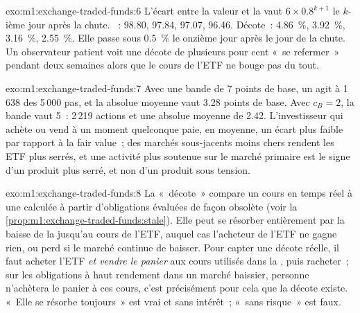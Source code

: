 \begin{solution}{exo:m1:exchange-traded-funds:6}
L'écart entre la valeur et la  vaut $6 \times 0.8^{k+1}$ le $k$-ième jour après
la chute. ~: 98.80, 97.84, 97.07, 96.46. Décote~: 4.86~\%, 3.92~\%, 3.16~\%,
2.55~\%. Elle passe sous 0.5~\% le onzième jour après le jour de la chute.
Un observateur patient voit une décote de plusieurs pour cent «~se refermer~» pendant deux
semaines alors que le cours de l'ETF ne bouge pas du tout.
\end{solution}

\begin{solution}{exo:m1:exchange-traded-funds:7}
Avec une bande de 7 points de base, un  agit à 1\,638 des
5\,000 pas, et la  absolue moyenne vaut 3.28 points de base. Avec $c_B =
2$, la bande vaut 5~: 2\,219 actions et une  absolue moyenne de 2.42. L'investisseur
qui achète ou vend à un moment quelconque paie, en moyenne, un écart plus faible
par rapport à la fair value~; des marchés sous-jacents moins chers rendent les ETF plus serrés, et
une activité plus soutenue sur le marché primaire est le signe d'un produit plus serré, et non
d'un produit sous tension.
\end{solution}

\begin{solution}{exo:m1:exchange-traded-funds:8}
La «~décote~» compare un cours en temps réel à une  calculée à partir d'obligations
évaluées de façon obsolète (voir la \cref{prop:m1:exchange-traded-funds:stale}). Elle peut
se résorber entièrement par la baisse de la  jusqu'au cours de l'ETF, auquel cas l'acheteur de l'ETF
ne gagne rien, ou perd si le marché continue de baisser. Pour capter une décote réelle,
il faut acheter l'ETF \emph{et vendre le panier} aux cours utilisés
dans la , puis racheter~; sur les obligations à haut rendement dans un marché baissier,
personne n'achètera le panier à ces cours, c'est précisément pour cela que la décote existe.
«~Elle se résorbe toujours~» est vrai et sans intérêt~; «~sans risque~» est faux.
\end{solution}

